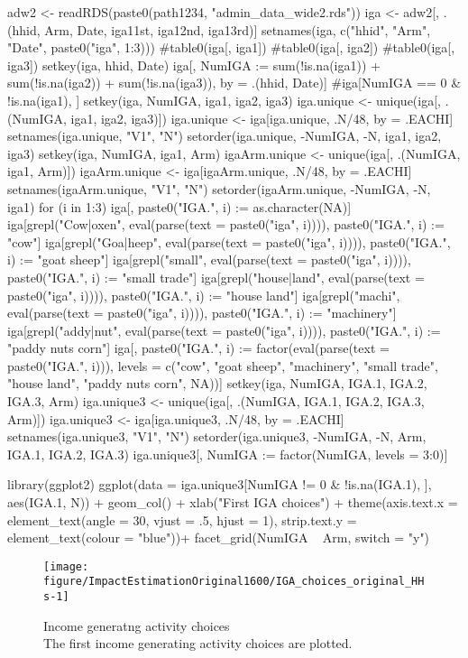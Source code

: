 \begin{Schunk}
\begin{Sinput}
adw2 <- readRDS(paste0(path1234, "admin_data_wide2.rds"))
iga <- adw2[, .(hhid, Arm, Date, iga11st, iga12nd, iga13rd)]
setnames(iga, c("hhid", "Arm", "Date", paste0("iga", 1:3)))
#table0(iga[, iga1])
#table0(iga[, iga2])
#table0(iga[, iga3])
setkey(iga, hhid, Date)
iga[, NumIGA := sum(!is.na(iga1)) + sum(!is.na(iga2)) + sum(!is.na(iga3)), by = .(hhid, Date)]
#iga[NumIGA == 0 & !is.na(iga1), ]
setkey(iga, NumIGA, iga1, iga2, iga3)
iga.unique <- unique(iga[, .(NumIGA, iga1, iga2, iga3)])
iga.unique <- iga[iga.unique, .N/48, by = .EACHI]
setnames(iga.unique, "V1", "N")
setorder(iga.unique, -NumIGA, -N, iga1, iga2, iga3)
setkey(iga, NumIGA, iga1, Arm)
igaArm.unique <- unique(iga[, .(NumIGA, iga1, Arm)])
igaArm.unique <- iga[igaArm.unique, .N/48, by = .EACHI]
setnames(igaArm.unique, "V1", "N")
setorder(igaArm.unique, -NumIGA, -N, iga1)
for (i in 1:3) {
  iga[, paste0("IGA.", i) := as.character(NA)]
  iga[grepl("Cow|oxen", eval(parse(text = paste0("iga", i)))), 
    paste0("IGA.", i) := "cow"]
  iga[grepl("Goa|heep", eval(parse(text = paste0("iga", i)))), 
    paste0("IGA.", i) := "goat sheep"]
  iga[grepl("small", eval(parse(text = paste0("iga", i)))), 
    paste0("IGA.", i) := "small trade"]
  iga[grepl("house|land", eval(parse(text = paste0("iga", i)))), 
    paste0("IGA.", i) := "house land"]
  iga[grepl("machi", eval(parse(text = paste0("iga", i)))), 
    paste0("IGA.", i) := "machinery"]
  iga[grepl("addy|nut", eval(parse(text = paste0("iga", i)))), 
    paste0("IGA.", i) := "paddy nuts corn"]
  iga[, paste0("IGA.", i) := factor(eval(parse(text = paste0("IGA.", i))), 
    levels = c("cow", "goat sheep", "machinery", "small trade", "house land", "paddy nuts corn", NA))]
}
setkey(iga, NumIGA, IGA.1, IGA.2, IGA.3, Arm)
iga.unique3 <- unique(iga[, .(NumIGA, IGA.1, IGA.2, IGA.3, Arm)])
iga.unique3 <- iga[iga.unique3, .N/48, by = .EACHI]
setnames(iga.unique3, "V1", "N")
setorder(iga.unique3, -NumIGA, -N, Arm, IGA.1, IGA.2, IGA.3)
iga.unique3[, NumIGA := factor(NumIGA, levels = 3:0)]
\end{Sinput}
\end{Schunk}
\begin{Schunk}
\begin{Sinput}
library(ggplot2)
ggplot(data = iga.unique3[NumIGA != 0 & !is.na(IGA.1), ], aes(IGA.1, N)) + 
  geom_col() +
  xlab("First IGA choices") +
  theme(axis.text.x = element_text(angle = 30, vjust = .5, hjust = 1), 
    strip.text.y = element_text(colour = "blue"))+
  facet_grid(NumIGA ~ Arm, switch = "y")
\end{Sinput}
\begin{figure}

{\centering \texttt{[image: figure/ImpactEstimationOriginal1600/IGA\_choices\_original\_HHs-1]} 

}

\caption{Income generatng activity choices\\ {\footnotesize The first income generating activity choices are plotted.\setlength{\baselineskip}{8pt}}}\label{Figure IGA choices original HHs}
\end{figure}
\end{Schunk}

